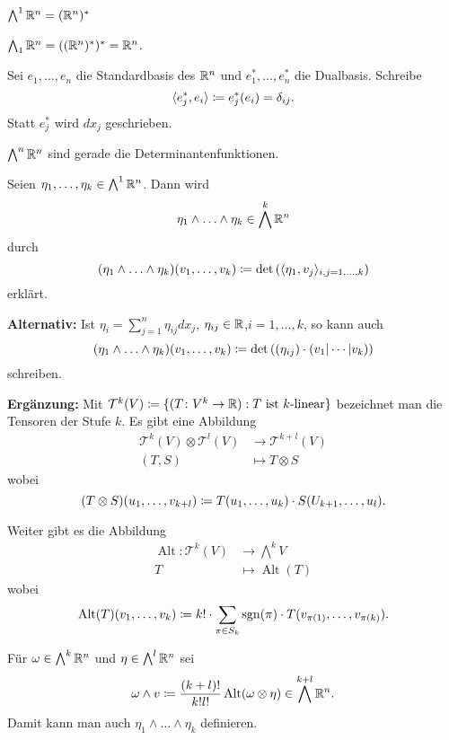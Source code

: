 \documentclass[a4paper,twoside,DIV15,BCOR12mm]{scrbook}
\begin{document}
\begin{bemerkungen}
\item $\bigwedge^1\mathbb{R}^n = (\mathbb{R}^n)^*$
\item $\bigwedge_1\mathbb{R}^n = ((\mathbb{R}^n)^*)^* =\mathbb{R}^n$.
\item Sei $e_1,\ldots,e_n$ die Standardbasis des $\mathbb{R}^n$ und $e_1^*,\ldots,e_n^*$ die Dualbasis. Schreibe
\[
\langle e_j^*,e_i\rangle \da e_j^*(e_i)  =\delta_{ij}.
\]
Statt $e_j^*$ wird $d{x_j}$ geschrieben.
\item $\bigwedge^n\mathbb{R}^n$ sind gerade die Determinantenfunktionen.
\end{bemerkungen}

\begin{definition}
Seien $\eta_1,\ldots,\eta_k\in \bigwedge^1\mathbb{R}^n$. Dann wird
\[
\eta_1\wedge \ldots\wedge \eta_k \in \bigwedge^k\mathbb{R}^n
\]
durch
\[
(\eta_1\wedge \ldots\wedge \eta_k)(v_1,\ldots,v_k) \da \det\left( \langle \eta_1,v_j\rangle_{i,j=1,\ldots,k}\right)
\]
erklärt.

\textbf{Alternativ:} Ist $\eta_i = \sum_{j=1}^n \eta_{ij} dx_j$, $\eta_{ij}\in \mathbb{R}$,$i=1,\ldots,k$, so kann auch 
\[
(\eta_1\wedge \ldots\wedge \eta_k)(v_1,\ldots,v_k) \da \det\left( (\eta_{ij})\cdot(v_1|\cdots|v_k) \right)
\]
schreiben.
\end{definition}

\textbf{Ergänzung:} Mit $\mathcal T^k(V)\da \{ (T\colon V^k\to\MdR) : T \text{ ist $k$-linear}\}$ bezeichnet man die Tensoren der Stufe $k$. Es gibt eine Abbildung
\begin{align*}
\mathcal T^k(V) \otimes \mathcal T^l(V) &\to \mathcal T^{k+l}(V) \\
(T,S) &\mapsto T\otimes S
\end{align*}
wobei
\[
(T\otimes S)(u_1,\ldots,v_{k+l}) \da T(u_1,\ldots,u_k) \cdot S(U_{k+1},\ldots,u_l).
\]

Weiter gibt es die Abbildung
\begin{align*}
\operatorname{Alt}\colon \mathcal T^k(V) &\to \bigwedge^k V\\
T & \mapsto \operatorname{Alt}(T)
\end{align*}
wobei
\[
\operatorname{Alt}(T)(v_1,\ldots,v_k) \da k! \cdot \sum_{\pi\in S_k} \operatorname{sgn}(\pi) \cdot T(v_{\pi(1)},\ldots,v_{\pi(k)}).
\]

Für $\omega\in \bigwedge^k\mathbb{R}^n$ und $\eta\in \bigwedge^l\mathbb{R}^n$ sei
\[
\omega \wedge v \da \frac{(k+l)!}{k!l!} \operatorname{Alt}(\omega\otimes \eta) \in \bigwedge^{k+l}\MdR^n.
\]
Damit kann man auch $\eta_1\wedge \ldots\wedge \eta_k$ definieren.
\end{document}

